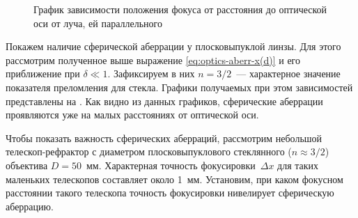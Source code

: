 \begin{wrapfigure}[12]{r}{0.55\tw}
    \centering
    \vspace{-.5pc}
    \caption{График зависимости положения фокуса от расстояния до оптической оси от луча, ей параллельного}
    \label{pic:sphere-aberrations-lens-plot}
\end{wrapfigure}
Покажем наличие сферической аберрации у плосковыпуклой линзы. Для этого рассмотрим полученное выше выражение \eqref{eq:optics-aberr-x(d)} и его приближение при $\delta \ll 1$. Зафиксируем в них $n=3/2$~--- характерное значение показателя преломления для стекла. Графики получаемых при этом зависимостей представлены на . Как видно из данных графиков, сферические аберрации проявляются уже на малых расстояниях от оптической оси.

Чтобы показать важность сферических аберраций, рассмотрим небольшой телескоп-рефрактор с диаметром плос\-ко\-вы\-пук\-ло\-во\-го стеклянного ($n \approx 3/2$) объектива $D = 50$~мм. Характерная точность фокусировки~$\Delta x$ для таких маленьких телескопов составляет около 1~мм. Установим, при каком фокусном расстоянии такого телескопа точность фокусировки нивелирует сферическую аберрацию.

